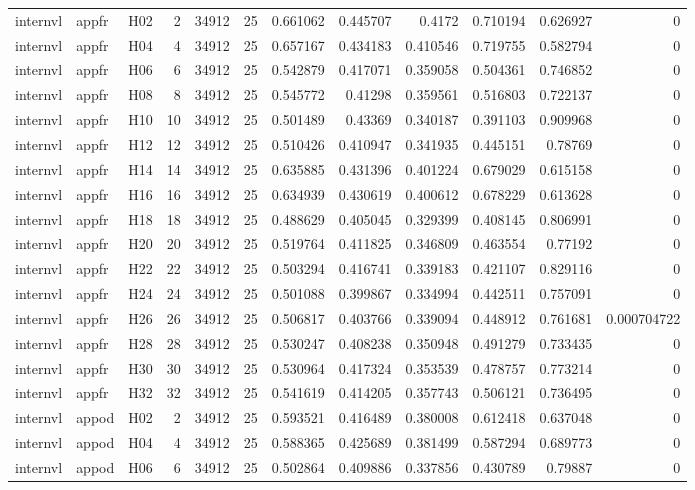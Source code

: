 \begin{longtable}{lllrrrrrrrrr}
internvl & appfr & H02 & 2 & 34912 & 25 & 0.661062 & 0.445707 & 0.4172 & 0.710194 & 0.626927 & 0 \\
internvl & appfr & H04 & 4 & 34912 & 25 & 0.657167 & 0.434183 & 0.410546 & 0.719755 & 0.582794 & 0 \\
internvl & appfr & H06 & 6 & 34912 & 25 & 0.542879 & 0.417071 & 0.359058 & 0.504361 & 0.746852 & 0 \\
internvl & appfr & H08 & 8 & 34912 & 25 & 0.545772 & 0.41298 & 0.359561 & 0.516803 & 0.722137 & 0 \\
internvl & appfr & H10 & 10 & 34912 & 25 & 0.501489 & 0.43369 & 0.340187 & 0.391103 & 0.909968 & 0 \\
internvl & appfr & H12 & 12 & 34912 & 25 & 0.510426 & 0.410947 & 0.341935 & 0.445151 & 0.78769 & 0 \\
internvl & appfr & H14 & 14 & 34912 & 25 & 0.635885 & 0.431396 & 0.401224 & 0.679029 & 0.615158 & 0 \\
internvl & appfr & H16 & 16 & 34912 & 25 & 0.634939 & 0.430619 & 0.400612 & 0.678229 & 0.613628 & 0 \\
internvl & appfr & H18 & 18 & 34912 & 25 & 0.488629 & 0.405045 & 0.329399 & 0.408145 & 0.806991 & 0 \\
internvl & appfr & H20 & 20 & 34912 & 25 & 0.519764 & 0.411825 & 0.346809 & 0.463554 & 0.77192 & 0 \\
internvl & appfr & H22 & 22 & 34912 & 25 & 0.503294 & 0.416741 & 0.339183 & 0.421107 & 0.829116 & 0 \\
internvl & appfr & H24 & 24 & 34912 & 25 & 0.501088 & 0.399867 & 0.334994 & 0.442511 & 0.757091 & 0 \\
internvl & appfr & H26 & 26 & 34912 & 25 & 0.506817 & 0.403766 & 0.339094 & 0.448912 & 0.761681 & 0.000704722 \\
internvl & appfr & H28 & 28 & 34912 & 25 & 0.530247 & 0.408238 & 0.350948 & 0.491279 & 0.733435 & 0 \\
internvl & appfr & H30 & 30 & 34912 & 25 & 0.530964 & 0.417324 & 0.353539 & 0.478757 & 0.773214 & 0 \\
internvl & appfr & H32 & 32 & 34912 & 25 & 0.541619 & 0.414205 & 0.357743 & 0.506121 & 0.736495 & 0 \\
internvl & appod & H02 & 2 & 34912 & 25 & 0.593521 & 0.416489 & 0.380008 & 0.612418 & 0.637048 & 0 \\
internvl & appod & H04 & 4 & 34912 & 25 & 0.588365 & 0.425689 & 0.381499 & 0.587294 & 0.689773 & 0 \\
internvl & appod & H06 & 6 & 34912 & 25 & 0.502864 & 0.409886 & 0.337856 & 0.430789 & 0.79887 & 0 \\

\end{longtable}
